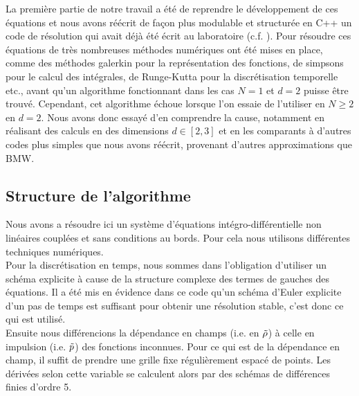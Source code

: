 \documentclass[10pt]{article}
\begin{document}
\begin{multicols}{2}
La première partie de notre travail a été de reprendre le développement de ces équations et nous avons réécrit de façon plus modulable et structurée en C++ un code de résolution qui avait déjà été écrit au laboratoire (c.f. ). Pour résoudre ces équations de très nombreuses méthodes numériques ont été mises en place, comme des méthodes galerkin \cite{shen1994efficient, LeonardThesis} pour la représentation des fonctions, de simpsons pour le calcul des intégrales, de Runge-Kutta pour la discrétisation temporelle etc., avant qu'un algorithme fonctionnant dans les cas $N=1$ et $d=2$ puisse être trouvé. Cependant, cet algorithme échoue lorsque l'on essaie de l'utiliser en $N \ge 2$ en $d=2$. Nous avons donc essayé d'en comprendre la cause, notamment en réalisant des calculs en des dimensions $d \in [2,3]$ et en les comparants à d'autres codes plus simples que nous avons réécrit, provenant d'autres approximations que BMW. 




\subsection{Structure de l'algorithme}

Nous avons a résoudre ici un système d'équations intégro-différentielle non linéaires couplées et sans conditions au bords. Pour cela nous utilisons différentes techniques numériques. \\

Pour la discrétisation en temps, nous sommes dans l'obligation d'utiliser un schéma explicite à cause de la structure complexe des termes de gauches des équations. Il a été mis en évidence dans ce code qu'un schéma d'Euler explicite d'un pas de temps est suffisant pour obtenir une résolution stable, c'est donc ce qui est utilisé. \\

Ensuite nous différencions la dépendance en champs (i.e. en $\tilde{\rho}$) à celle en impulsion (i.e. $\tilde{p}$) des fonctions inconnues. Pour ce qui est de la dépendance en champ, il suffit de prendre une grille fixe régulièrement espacé de points. Les dérivées selon cette variable se calculent alors par des schémas de différences finies d'ordre 5. \\


\end{multicols}
\end{document}
